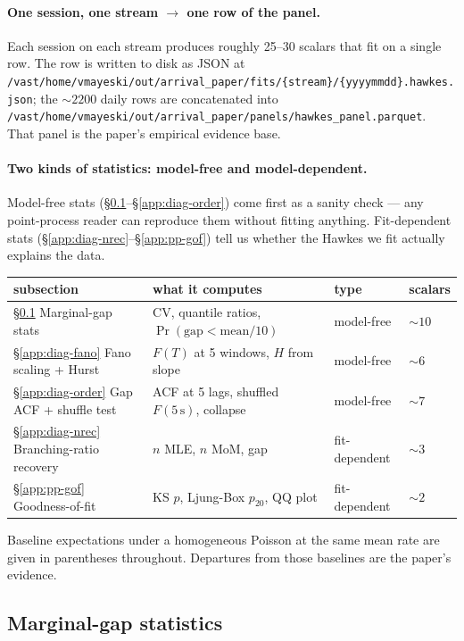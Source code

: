 \paragraph{One session, one stream $\to$ one row of the panel.} Each session on each stream produces roughly 25--30 scalars that fit on a single row. The row is written to disk as JSON at \texttt{/vast/home/vmayeski/out/arrival\_paper/fits/\{stream\}/\{yyyymmdd\}.hawkes.json}; the $\sim 2200$ daily rows are concatenated into \texttt{/vast/home/vmayeski/out/arrival\_paper/panels/hawkes\_panel.parquet}. That panel is the paper's empirical evidence base.

\paragraph{Two kinds of statistics: model-free and model-dependent.} Model-free stats (\S\ref{app:diag-marginal}--\S\ref{app:diag-order}) come first as a sanity check --- any point-process reader can reproduce them without fitting anything. Fit-dependent stats (\S\ref{app:diag-nrec}--\S\ref{app:pp-gof}) tell us whether the Hawkes we fit actually explains the data.

\begin{center}
\begin{tabular}{@{}llll@{}}
\toprule
subsection & what it computes & type & scalars \\
\midrule
\S\ref{app:diag-marginal} Marginal-gap stats & CV, quantile ratios, $\Pr(\text{gap}<\text{mean}/10)$ & model-free & $\sim 10$ \\
\S\ref{app:diag-fano} Fano scaling + Hurst & $F(T)$ at 5 windows, $H$ from slope & model-free & $\sim 6$ \\
\S\ref{app:diag-order} Gap ACF + shuffle test & ACF at 5 lags, shuffled $F(5\,\mathrm{s})$, collapse & model-free & $\sim 7$ \\
\S\ref{app:diag-nrec} Branching-ratio recovery & $n$ MLE, $n$ MoM, gap & fit-dependent & $\sim 3$ \\
\S\ref{app:pp-gof} Goodness-of-fit & KS $p$, Ljung-Box $p_{20}$, QQ plot & fit-dependent & $\sim 2$ \\
\bottomrule
\end{tabular}
\end{center}

Baseline expectations under a homogeneous Poisson at the same mean rate are given in parentheses throughout. Departures from those baselines are the paper's evidence.

\subsection{Marginal-gap statistics}
\label{app:diag-marginal}

